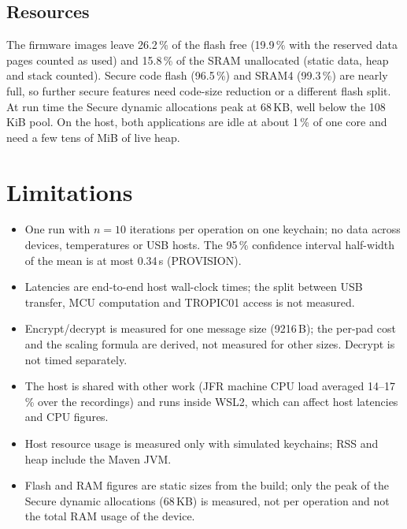 \documentclass[11pt,a4paper]{report}
\begin{document}
\section{Resources}

The firmware images leave 26.2\,\% of the flash free (19.9\,\% with the reserved data pages counted as used) and 15.8\,\% of the SRAM unallocated (static data, heap and stack counted). Secure code flash (96.5\,\%) and SRAM4 (99.3\,\%) are nearly full, so further secure features need code-size reduction or a different flash split. At run time the Secure dynamic allocations peak at 68\,KB, well below the 108\,KiB pool. On the host, both applications are idle at about 1\,\% of one core and need a few tens of MiB of live heap.

\chapter{Limitations}

\begin{itemize}
\item One run with $n = 10$ iterations per operation on one keychain; no data across devices, temperatures or USB hosts. The 95\,\% confidence interval half-width of the mean is at most 0.34\,s (PROVISION).
\item Latencies are end-to-end host wall-clock times; the split between USB transfer, MCU computation and TROPIC01 access is not measured.
\item Encrypt/decrypt is measured for one message size (9216\,B); the per-pad cost and the scaling formula are derived, not measured for other sizes. Decrypt is not timed separately.
\item The host is shared with other work (JFR machine CPU load averaged 14--17\,\% over the recordings) and runs inside WSL2, which can affect host latencies and CPU figures.
\item Host resource usage is measured only with simulated keychains; RSS and heap include the Maven JVM.
\item Flash and RAM figures are static sizes from the build; only the peak of the Secure dynamic allocations (68\,KB) is measured, not per operation and not the total RAM usage of the device.
\end{itemize}
\end{document}
